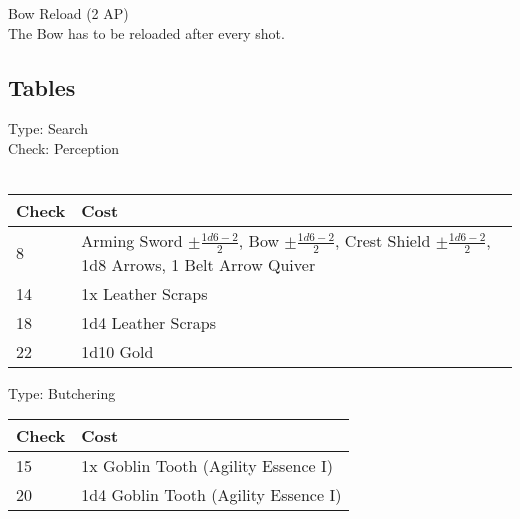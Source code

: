 Bow Reload (2 AP)\\
The Bow has to be reloaded after every shot.

\subsection{Tables}
Type: Search\\
Check: Perception\\
\\
\begin{minipage}{0.8\textwidth}
	\begin{tabular}{|l | p{11cm}|}
		\hline
		Check & Cost\\
		\hline
		8 & Arming Sword $\pm \frac{1d6 - 2}{2}$, Bow $\pm \frac{1d6 - 2}{2}$, Crest Shield $\pm \frac{1d6 - 2}{2}$, 1d8 Arrows, 1 Belt Arrow Quiver\\
		14 & 1x Leather Scraps\\
		18 & 1d4 Leather Scraps\\
		22 & 1d10 Gold\\
		\hline
	\end{tabular}
\end{minipage}

Type: Butchering
\\
\begin{minipage}{0.8\textwidth}
	\begin{tabular}{|l | l|}
		\hline
		Check & Cost\\
		\hline
		15 & 1x Goblin Tooth (Agility Essence I)\\
		20 & 1d4 Goblin Tooth (Agility Essence I)\\
		\hline
	\end{tabular}
\end{minipage}
\pagebreak